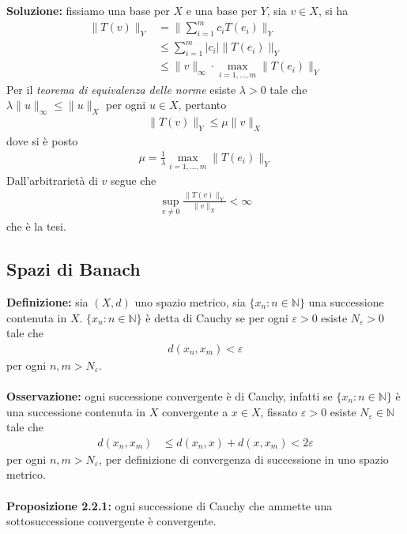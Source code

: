 \documentclass{article}
\numberwithin{equation}{subsection}
\begin{document}
\textbf{Soluzione:} fissiamo una base per $X$ e una base per $Y$, sia $v \in X$, si ha
\begin{align*}
    \|T(v)\|_Y &= \|\sum_{i = 1}^mc_iT(e_i)\|_Y  \\
    &\leq \sum_{i = 1}^m|c_i|\|T(e_i)\|_Y  \\
    &\leq \|v\|_\infty \cdot \max_{i = 1, \dots, m}\|T(e_i)\|_Y 
\end{align*}
Per il \textit{teorema di equivalenza delle norme} esiste $\lambda > 0$ tale che $\lambda\|u\|_\infty \leq \|u\|_X$ per ogni $u \in X$, pertanto
\begin{align*}
    \|T(v)\|_Y \leq \mu \|v\|_X 
\end{align*}
dove si è posto
\begin{align*}
    \mu = \frac{1}{\lambda}\max_{i = 1, \dots, m}\|T(e_i)\|_Y 
\end{align*}
Dall'arbitrarietà di $v$ segue che
\begin{align*}
    \sup_{v \neq 0}\frac{\|T(v)\|_Y}{\|v\|_X} < \infty 
\end{align*}
che è la tesi.

\newpage
\subsection{Spazi di Banach}
\textbf{Definizione:} sia $(X, d)$ uno spazio metrico, sia $\{x_n : n \in \mathbb{N}\}$ una successione contenuta in $X$. $\{x_n : n \in \mathbb{N}\}$ è detta di Cauchy se per ogni $\varepsilon > 0$ esiste $N_\varepsilon > 0$ tale che
\begin{align*}
    d(x_n, x_m) < \varepsilon 
\end{align*}
per ogni $n, m > N_\varepsilon$. \\ \\
\textbf{Osservazione:} ogni successione convergente è di Cauchy, infatti se $\{x_n : n \in \mathbb{N}\}$ è una successione contenuta in $X$ convergente a $x \in X$, fissato $\varepsilon > 0$ esiste $N_\varepsilon \in \mathbb{N}$ tale che
\begin{align*}
    d(x_n, x_m) &\leq d(x_n, x) + d(x, x_m) < 2\varepsilon 
\end{align*}
per ogni $n, m > N_\varepsilon$, per definizione di convergenza di successione in uno spazio metrico. \\ \\
\textbf{Proposizione 2.2.1:} ogni successione di Cauchy che ammette una sottosuccessione convergente è convergente. \\
\end{document}
